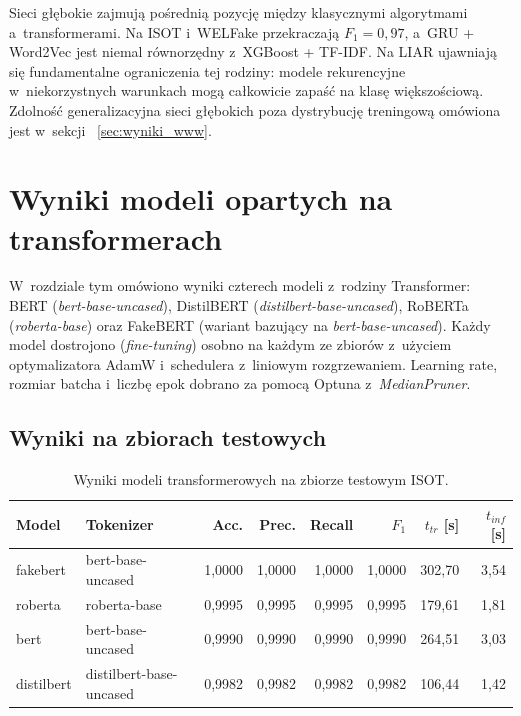 \documentclass[oneside,polski,logo]{amuthesis}
\begin{document}
Sieci głębokie zajmują pośrednią pozycję między klasycznymi algorytmami
a~transformerami. Na ISOT i~WELFake przekraczają \(F_1 = 0{,}97\), a~GRU + Word2Vec jest niemal
równorzędny z~XGBoost + TF-IDF. Na LIAR ujawniają się fundamentalne
ograniczenia tej rodziny: modele rekurencyjne w~niekorzystnych warunkach
mogą całkowicie zapaść na klasę większościową. Zdolność generalizacyjna
sieci głębokich poza dystrybucję treningową omówiona jest w~sekcji~%
\ref{sec:wyniki_www}.

\section{Wyniki modeli opartych na transformerach}
\label{sec:wyniki_transformery}

W~rozdziale tym omówiono wyniki czterech modeli z~rodziny Transformer:
BERT (\textit{bert-base-uncased}), DistilBERT (\textit{distilbert-base-uncased}),
RoBERTa (\textit{roberta-base}) oraz FakeBERT (wariant bazujący na
\textit{bert-base-uncased}). Każdy model dostrojono (\textit{fine-tuning})
osobno na każdym ze zbiorów z~użyciem optymalizatora AdamW i~schedulera
z~liniowym rozgrzewaniem. Learning rate, rozmiar batcha i~liczbę
epok dobrano za pomocą Optuna z~\textit{MedianPruner}.

\subsection{Wyniki na zbiorach testowych}
\label{sec:wyniki_bert_test}

\begin{table}[ht]
\centering
\caption{Wyniki modeli transformerowych na zbiorze testowym ISOT.}
\label{tab:bert_isot}
\begin{tabular}{llrrrrrr}
\toprule
Model & Tokenizer & Acc. & Prec. & Recall & $F_1$ & $t_{tr}$ [s] & $t_{inf}$ [s] \\
\midrule
fakebert   & bert-base-uncased       & 1,0000 & 1,0000 & 1,0000 & 1,0000 & 302,70 & 3,54 \\
roberta    & roberta-base            & 0,9995 & 0,9995 & 0,9995 & 0,9995 & 179,61 & 1,81 \\
bert       & bert-base-uncased       & 0,9990 & 0,9990 & 0,9990 & 0,9990 & 264,51 & 3,03 \\
distilbert & distilbert-base-uncased & 0,9982 & 0,9982 & 0,9982 & 0,9982 & 106,44 & 1,42 \\
\bottomrule
\end{tabular}
\end{table}
\end{document}
